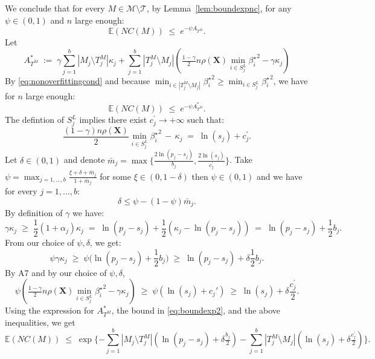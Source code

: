 \documentclass[aos]{imsart}
\theoremstyle{plain}
\newcommand{\E}{\mathbb{E}}
\newcommand{\T}{\mathcal{T}}
\newcommand{\bs}{\boldsymbol}
\begin{document}
We conclude that for every $M\in \mathcal M\setminus \T$, by Lemma~\ref{lem:boundexpnc}, for any $\psi\in(0,1)$ and $n$ large enough:
$$
\E(NC(M))\;\leq\;e^{-\psi A_{T^M}}.
$$
Let 
$$A_{T^M}^*\;:=\;\gamma\sum_{j=1}^b|M_j \setminus T^M_j|\kappa_j + \sum_{j=1}^b |T^M_j\setminus M_j |\left(\tfrac{1-\gamma}{2} n \rho(\bs X) \min_{i\in S^L_j}{\beta^{\star}_i}^{2} - \gamma\kappa_j\right) $$
By \eqref{eq:nonoverfittingcond} and because $\min_{i\in |T^M_j\setminus M_j|}{\beta^{\star}_i}^{2}\geq \min_{i\in S^L_j}{\beta^{\star}_i}^{2}$, we have for $n$ large enough:
\begin{equation}\label{eq:boundexp2}
    \E(NC(M))\;\leq\;e^{-\psi A_{T^M}^*}.
\end{equation}
The defintion of $S^L_j$ implies there exist $c^{\prime}_j \to +\infty$ such that:
$$\frac{(1-\gamma) n\rho(\bs X)}{2}\min_{i\in S^L_j}{\beta^{\star}_i}^{2}\,- \,\kappa_j \;=\; \ln(s_j) + c^{\prime}_{j}.$$
Let $\delta \in (0,1)$ and denote $\bar{m}_j=\max\big\{\frac{2\ln(p_j-s_j)}{b_{j}},\frac{2\ln(s_j)}{c^{\prime}_{j}}\big\}$. Take $\psi=\max_{j=1,\ldots,b}\frac{\xi + \delta + \bar{m}_j}{1+\bar{m}_j}$ for some $\xi \in(0, 1- \delta)$ then $\psi \in (0,1)$ and we have for every $j=1,\ldots,b$:
$$\delta \leq \psi-(1-\psi)\bar{m}_j.$$ 
By definition of $\gamma$ we have: 
$$
\gamma\kappa_j\;\geq\;\frac12 (1+\alpha_j)\kappa_j\;=\;\ln(p_j-s_j)+\frac12(\kappa_j-\ln(p_j-s_j)) \;=\; \ln(p_j-s_j)+ \frac12b_{j}.
$$
From our choice of $\psi,\delta$, we get:
$$\psi\gamma\kappa_j \;\geq\; \psi\big(\ln(p_j-s_j)+ \frac12b_{j}\big) \;\geq\;  \ln(p_j-s_j)+ \delta\frac12b_{j}.$$
By A7 and by our choice of $\psi,\delta$,
$$\psi\left(\tfrac{1-\gamma}{2} n \rho(\bs X) \min_{i\in S^L_j}{\beta^{\star}_i}^{2} - \gamma\kappa_j\right) \;\geq\; \psi\left(\ln(s_j)+c_j'\right) \;\geq\; \ln(s_j)+\delta \frac{c^{\prime}_j}{2}.
$$
Using the expression for $A_{T^M}^*$, the bound in \eqref{eq:boundexp2}, and the above inequalities, we get
$$
\E(NC(M))\;\leq\;\exp\{- \sum_{j=1}^b |M_j\setminus T^M_j|(\ln(p_j-s_j)+\delta \tfrac{b_j}{2})-\sum_{j=1}^b |T^M_j\setminus M_j|(\ln(s_j)+\delta \tfrac{c^{\prime}_j}{2})\}.
$$
\end{document}
